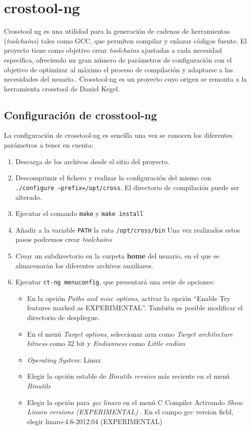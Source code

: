 \documentclass{article}
\begin{document}
\section{crostool-ng}

Crosstool ng es una utilidad para la generación de cadenas de herramientas (\textit{toolchains}) tales como GCC, que permiten compilar y enlazar códigos fuente. El proyecto tiene como objetivo crear \textit{toolchains} ajustadas a cada necesidad específica, ofreciendo un gran número de parámetros de configuración con el objetivo de optimizar al máximo el proceso de compilación y adaptarse a las necesidades del usuario.. Crosstool-ng es un proyecto cuyo origen se remonta a la herramienta crosstool de Daniel Kegel.


\subsection{Configuración de crosstool-ng}

La configuración de crosstool-ng es sencilla una vez se conocen los diferentes parámetros a tener en cuenta:

\begin{enumerate}
\item Descarga de los archivos desde el sitio del proyecto.
\item Descomprimir el fichero y realizar la configuración del mismo con \texttt{./configure --prefix=/opt/cross}. El directorio de compilación puede ser alterado.
\item Ejecutar el comando \texttt{make} y \texttt{make install}
\item Añadir a la variable \texttt{PATH} la ruta \texttt{/opt/cross/bin}
Una vez realizados estos pasos podremos crear \textit{toolchains}
\item Crear un subdirectorio en la carpeta \textbf{home} del usuario, en el que se almacenarán los diferentes archivos auxiliares.
\item Ejecutar \texttt{ct-ng menuconfig}, que presentará una serie de opciones:

\begin{itemize}
\item En la opción \textit{Paths and misc options}, activar la opción ``Enable Try features marked as EXPERIMENTAL''. También es posible modificar el directorio de despliegue.
\item En el menú \textit{Target options}, seleccionar arm como \textit{Target architecture} \textit{bitness} como 32 bit y \textit{Endianness} como \textit{Little endian}
\item \textit{Operating System}: Linux
\item Elegir la opción estable de \textit{Binutils version} más reciente en el menú \textit{Binutils}
\item Elegir la opción para \textit{gcc} \textit{linaro} en el menú C Compiler%
Activando \textit{ Show Linaro versions (EXPERIMENTAL) }. En el campo  gcc version field, elegir linaro-4.6-2012.04 (EXPERIMENTAL) 
\end{itemize}
\end{enumerate}
\end{document}
